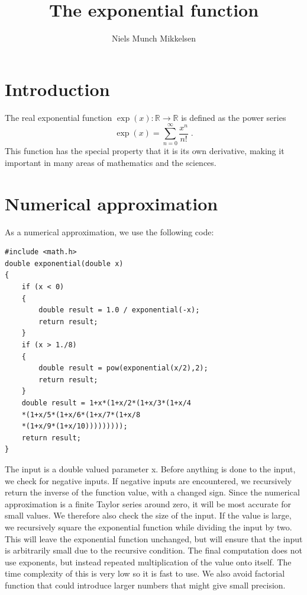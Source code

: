\documentclass[twocolumn]{article}
\title{\textbf{The exponential function}}
\author{Niels Munch Mikkelsen}
\begin{document}
    \maketitle

    \section{Introduction}
    The real exponential function $\exp(x): \mathbb{R}\rightarrow\mathbb{R}$ is defined as the power series
    \begin{equation}\label{eq:power}
    \exp(x) = \sum_{n=0}^\infty \frac{x^n}{n!} \;.
    \end{equation}
    This function has the special property that it is its own derivative, making it important in many areas of mathematics and the sciences.

    \section{Numerical approximation}
    As a numerical approximation, we use the following code:

    \begin{lstlisting}
#include <math.h>
double exponential(double x)
{
    if (x < 0)
    {
        double result = 1.0 / exponential(-x);
        return result;
    }
    if (x > 1./8)
    {
        double result = pow(exponential(x/2),2);
        return result;
    }
    double result = 1+x*(1+x/2*(1+x/3*(1+x/4
    *(1+x/5*(1+x/6*(1+x/7*(1+x/8
    *(1+x/9*(1+x/10)))))))));
    return result;
}
    \end{lstlisting}
    The input is a double valued parameter x. Before anything is done to the input, we check for negative inputs. If negative inputs are encountered, we recursively return the inverse of the function value, with a changed sign.
    Since the numerical approximation is a finite Taylor series around zero, it will be most accurate for small values. We therefore also check the size of the input. If the value is large, we recursively square the exponential function while dividing the input by two. This will leave the exponential function unchanged, but will ensure that the input is arbitrarily small due to the recursive condition.
    The final computation does not use exponents, but instead repeated multiplication of the value onto itself. The time complexity of this is very low so it is fast to use. We also avoid factorial function that could introduce larger numbers that might give small precision.
\end{document}
